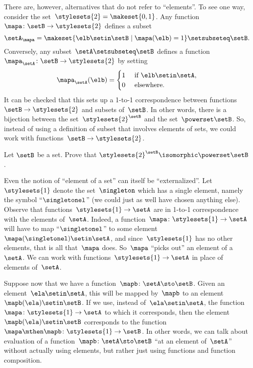 There are, however, alternatives that do not refer to ``elements''.
To see one way, consider the set~$\stylesets{2} = \makeset{ 0, 1}$.
Any function~$\mapa \colon \setB \to \stylesets{2}$ defines a subset
\begin{equation}
    \setA_\mapa = \makeset{ \elb \setin\setB \mid \mapa(\elb) = 1 } \setsubseteq \setB.
\end{equation}
Conversely, any subset~$\setA \setsubseteq \setB$ defines a function~$\mapa_\setA \colon \setB \to \stylesets{2}$ by setting
\begin{equation}
    \mapa_\setA(\elb) = \begin{cases}
        1 & \text{ if }\elb\setin\setA, \\
        0 & \text{ elsewhere}.
    \end{cases}
\end{equation}
It can be checked that this sets up a 1-to-1 correspondence between functions~$\setB \to \stylesets{2}$ and subsets of~$\setB$.
In other words, there is a bijection between the set~$\stylesets{2}^\setB$ and the set~$\powerset \setB$.
So, instead of using a definition of subset that involves elements of sets, we could work with functions~$\setB \to \stylesets{2}$.

\begin{gradedexercise}
    \label{ex:SubsetsAsFunctions}

    Let $\setB$ be a set.
    Prove that $\stylesets{2}^\setB \isomorphic \powerset \setB$.
\end{gradedexercise}


Even the notion of ``element of a set'' can itself be ``externalized''.
Let~$\stylesets{1}$ denote the set~$\singleton$ which has a single element, namely the symbol ``$\singletonel$'' (we could just as well have chosen anything else).
Observe that functions~$\stylesets{1} \to \setA$ are in 1-to-1 correspondence with the elements of~$\setA$.
Indeed, a function~$\mapa\colon \stylesets{1} \to \setA$ will have to map ``$\singletonel$'' to some element~$\mapa(\singletonel) \setin\setA$, and since~$\stylesets{1}$ has no other elements, that is all that~$\mapa$ does.
So~$\mapa$ ``picks out'' an element of a~$\setA$.
We can work with functions~$\stylesets{1} \to \setA$ in place of elements of~$\setA$.

Suppose now that we have a function~$\mapb \colon \setA \sto \setB$.
Given an element~$\ela \setin\setA$, this will be mapped by~$\mapb$ to an element~$\mapb(\ela) \setin\setB$.
If we use, instead of~$\ela \setin\setA$, the function~$\mapa \colon \stylesets{1} \to \setA$ to which it corresponds, then the element~$\mapb(\ela) \setin\setB$ corresponds to the function~$\mapa \mthen \mapb\colon \stylesets{1} \to \setB$.
In other words, we can talk about evaluation of a function~$\mapb \colon \setA \sto \setB$ ``at an element of~$\setA$'' without actually using elements, but rather just using functions and function composition.


